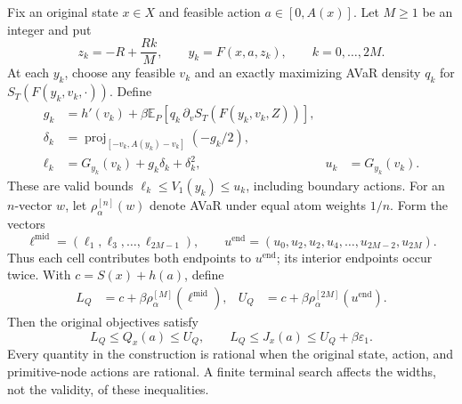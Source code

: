 \begin{proposition}
\label{prop:independentvalidation119}
Fix an original state $x\in X$ and feasible action $a\in[0,A(x)]$.
Let $M\ge1$ be an integer and put
\[
 z_k=-R+\frac{Rk}{M},\qquad y_k=F(x,a,z_k),
       \qquad k=0,\ldots,2M.
\]
At each $y_k$, choose any feasible $v_k$ and an exactly maximizing AVaR
density $q_k$ for $S_T(F(y_k,v_k,\cdot))$.  Define
\begin{align*}
 g_k&=h'(v_k)+\beta\mathbb E_P
                [q_k\,\partial_v S_T(F(y_k,v_k,Z))],\\
 \delta_k&=\operatorname{proj}_{[-v_k,A(y_k)-v_k]}(-g_k/2),\\
 \ell_k&=G_{y_k}(v_k)+g_k\delta_k+\delta_k^2,
       &u_k&=G_{y_k}(v_k).
\end{align*}
These are valid bounds $\ell_k\le V_1(y_k)\le u_k$, including
boundary actions.  For an $n$-vector $w$, let $\rho_\alpha^{[n]}(w)$
denote AVaR under equal atom weights $1/n$.  Form the vectors
\[
 \ell^{\mathrm{mid}}=(\ell_1,\ell_3,\ldots,\ell_{2M-1}),
 \qquad
 u^{\mathrm{end}}=(u_0,u_2,u_2,u_4,\ldots,u_{2M-2},u_{2M}).
\]
Thus each cell contributes both endpoints to $u^{\mathrm{end}}$;
its interior endpoints occur twice.  With $c=S(x)+h(a)$, define
\begin{align}
 L_Q&=c+\beta\rho_\alpha^{[M]}(\ell^{\mathrm{mid}}),&
 U_Q&=c+\beta\rho_\alpha^{[2M]}(u^{\mathrm{end}}).
 \label{eq:independentQ119}
\end{align}
Then the original objectives satisfy
\begin{equation}\label{eq:independentJ119}
 L_Q\le Q_x(a)\le U_Q,
 \qquad L_Q\le J_x(a)\le U_Q+\beta\varepsilon_1.
\end{equation}
Every quantity in the construction is rational when the original state,
action, and primitive-node actions are rational.  A finite terminal search
affects the widths, not the validity, of these inequalities.
\end{proposition}

